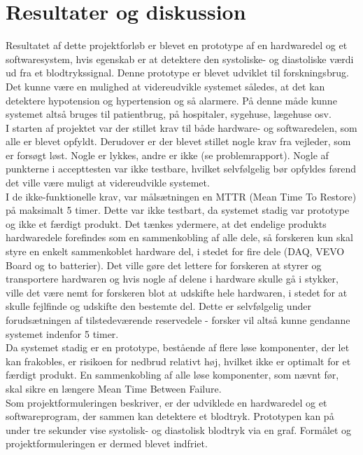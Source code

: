 \section{Resultater og diskussion}
Resultatet af dette projektforløb er blevet en prototype af en hardwaredel og et softwaresystem, hvis egenskab er at detektere den systoliske- og diastoliske værdi ud fra et blodtrykssignal. Denne prototype er blevet udviklet til forskningsbrug. Det kunne være en mulighed at videreudvikle systemet således, at det kan detektere hypotension og hypertension og så alarmere. På denne måde kunne systemet altså bruges til patientbrug, på hospitaler, sygehuse, lægehuse osv. \\
I starten af projektet var der stillet krav til både hardware- og softwaredelen, som alle er blevet opfyldt. Derudover er der blevet stillet nogle krav fra vejleder, som er forsøgt løst. Nogle er lykkes, andre er ikke (se problemrapport). Nogle af punkterne i accepttesten var ikke testbare, hvilket selvfølgelig bør opfyldes førend det ville være muligt at videreudvikle systemet. \\
I de ikke-funktionelle krav, var målsætningen en MTTR (Mean Time To Restore) på maksimalt 5 timer. Dette var ikke testbart, da systemet stadig var prototype og ikke et færdigt produkt.
Det tænkes ydermere, at det endelige produkts hardwaredele forefindes som en sammenkobling af alle dele, så forskeren kun skal styre en enkelt sammenkoblet hardware del, i stedet for fire dele (DAQ, VEVO Board og to batterier). Det ville gøre det lettere for forskeren at styrer og transportere hardwaren og hvis nogle af delene i hardware skulle gå i stykker, ville det være nemt for forskeren blot at udskifte hele hardwaren, i stedet for at skulle fejlfinde og udskifte den bestemte del. Dette er selvfølgelig under forudsætningen af tilstedeværende reservedele - forsker vil altså kunne gendanne systemet indenfor 5 timer. \\
Da systemet stadig er en prototype, bestående af flere løse komponenter, der let kan frakobles, er risikoen for nedbrud relativt høj, hvilket ikke er optimalt for et færdigt produkt. En sammenkobling af alle løse komponenter, som nævnt før, skal sikre en længere Mean Time Between Failure. \\
Som projektformuleringen beskriver, er der udviklede en hardwaredel og et softwareprogram, der sammen kan detektere et blodtryk. Prototypen kan på under tre sekunder vise systolisk- og diastolisk blodtryk via en graf. Formålet og projektformuleringen er dermed blevet indfriet.  \\
